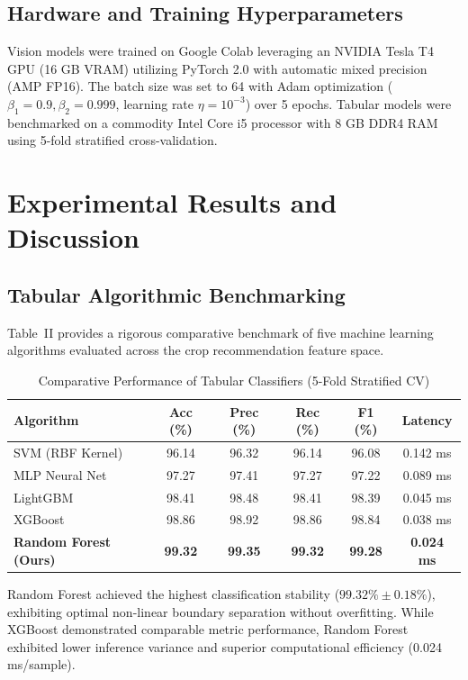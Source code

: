 \documentclass[conference]{IEEEtran}
\begin{document}
\subsection{Hardware and Training Hyperparameters}
Vision models were trained on Google Colab leveraging an NVIDIA Tesla T4 GPU (16 GB VRAM) utilizing PyTorch 2.0 with automatic mixed precision (AMP FP16). The batch size was set to 64 with Adam optimization ($\beta_1=0.9, \beta_2=0.999$, learning rate $\eta = 10^{-3}$) over 5 epochs. Tabular models were benchmarked on a commodity Intel Core i5 processor with 8 GB DDR4 RAM using 5-fold stratified cross-validation.

\section{Experimental Results and Discussion}

\subsection{Tabular Algorithmic Benchmarking}
Table~II provides a rigorous comparative benchmark of five machine learning algorithms evaluated across the crop recommendation feature space.

\begin{table}[h]
\caption{Comparative Performance of Tabular Classifiers (5-Fold Stratified CV)}
\centering
\begin{tabular}{@{}lccccc@{}}
\toprule
\textbf{Algorithm} & \textbf{Acc (\%)} & \textbf{Prec (\%)} & \textbf{Rec (\%)} & \textbf{F1 (\%)} & \textbf{Latency} \\ \midrule
SVM (RBF Kernel) & 96.14 & 96.32 & 96.14 & 96.08 & 0.142 ms \\
MLP Neural Net & 97.27 & 97.41 & 97.27 & 97.22 & 0.089 ms \\
LightGBM & 98.41 & 98.48 & 98.41 & 98.39 & 0.045 ms \\
XGBoost & 98.86 & 98.92 & 98.86 & 98.84 & 0.038 ms \\
\textbf{Random Forest (Ours)} & \textbf{99.32} & \textbf{99.35} & \textbf{99.32} & \textbf{99.28} & \textbf{0.024 ms} \\ \bottomrule
\end{tabular}
\end{table}

Random Forest achieved the highest classification stability ($99.32\% \pm 0.18\%$), exhibiting optimal non-linear boundary separation without overfitting. While XGBoost demonstrated comparable metric performance, Random Forest exhibited lower inference variance and superior computational efficiency (0.024 ms/sample).
\end{document}
